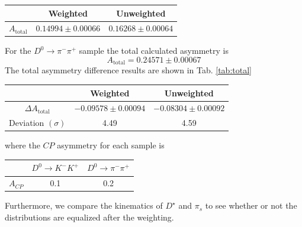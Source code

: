 \documentclass{article}
\begin{document}
    \begin{center}
        \begin{tabular}{c|c|c}
             & Weighted & Unweighted\\
             \hline\hline
            $A_{\text{total}}$ & $0.14994 \pm 0.00066$ & $0.16268 \pm 0.00064$\\
        \end{tabular}
    \end{center}

    For the $D^0\to \pi^-\pi^+$ sample the total calculated asymmetry is
    \begin{equation}
        A_{\text{total}} = 0.24571 \pm 0.00067
    \end{equation}
    The total asymmetry difference results are shown in Tab. \ref{tab:total}
    \begin{center}
        \begin{tabular}{c|c|c}
             & Weighted & Unweighted\\
             \hline\hline
            $\Delta A_{\text{total}}$ & $- 0.09578 \pm 0.00094$ & $-0.08304 \pm 0.00092$\\
            Deviation $(\sigma)$&  4.49 & 4.59\\
        \end{tabular}
        \label{tab:total}
    \end{center}
    where the $CP$ asymmetry for each sample is 
    \begin{center}
        \begin{tabular}{c|c|c}
            & $D^0\to K^-K^+$ & $D^0\to \pi^-\pi^+$\\
            \hline\hline
            $A_{CP}$ & 0.1 & 0.2 
        \end{tabular}
    \end{center}

    Furthermore, we compare the kinematics of $D^\star$ and $\pi_s$ to see whether or not the distributions are equalized after the weighting.
\end{document}
